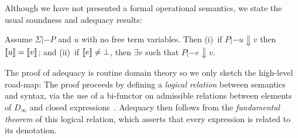 \begin{comment}
Types do not matter at all for our denotational semantics.
\begin{lemma}[Type irrelevance]
It is the case that $\interp{u}{\sigma}{\rho} = \interp{u[\ol{\tau}/\as]}{\sigma}{\rho}$
for any type substitution of variable $\as$ to types $\taus$.
\end{lemma}
The following is an essential lemma for establishing the soundness of denotational semantics:
\begin{lemma}[Substitutivity]
If $\Sigma;\Delta,x{:}\tau |- e : \tau$ and $\rho$ is a semantic environment
and $\Sigma;\Delta |- e' : \tau'$ then
\[ \interp{e}{\sigma}{\rho,x |-> \interp{e'}{\sigma}{\rho}} = \interp{e[e'/x]}{\sigma}{\rho} \]
and if $\Sigma;\Delta,x{:}\tau |- u : \tau$ then
\[ \interp{u}{\sigma}{\rho,x |-> \interp{e'}{\sigma}{\rho}} = \interp{u[e'/x]}{\sigma}{\rho} \]
\end{lemma}
\end{comment}
Although we have not presented a formal operational semantics, we state the usual
soundness and adequacy results:
\begin{theorem}\label{thm:adequacy}
Assume $\Sigma |- P$ and $u$ with no free term variables. Then (i)~if $P |- u \Downarrow v$ then $[\![u]\!] = [\![v]\!] $; and (ii)~if $[\![e]\!] \neq \bot$, then
$\exists v$ such that $P |- e \Downarrow v$.
\end{theorem}
The proof of adequacy is routine domain theory so we only sketch the
high-level road-map: The proof proceeds by defining a {\em logical relation} between
semantics and syntax, via the use of a bi-functor on admissible relations between 
elements of $D_\infty$ and closed expressions~\cite{pitts-rel-domains}. Adequacy 
then follows from the {\em fundamental theorem} of this logical relation, which asserts 
that every expression is related to its denotation.

